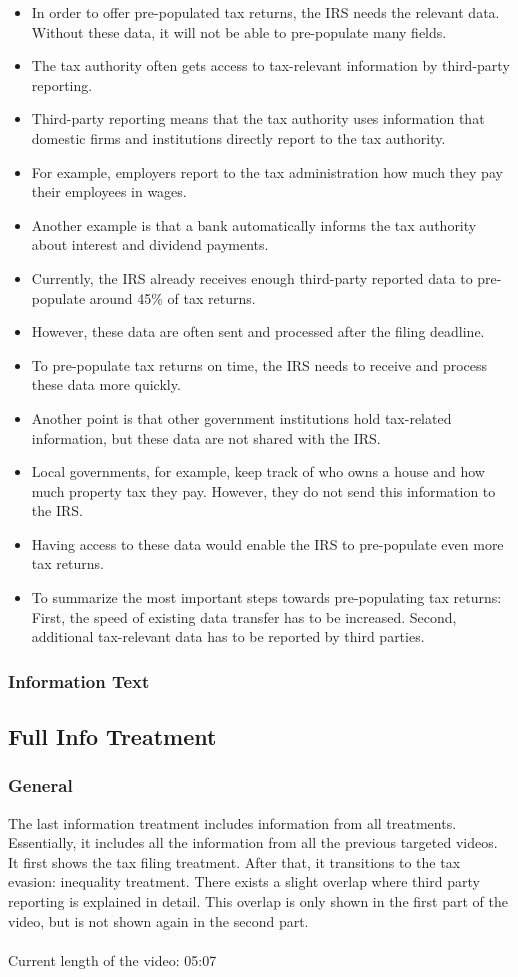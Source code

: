 \documentclass[11pt]{article}
\begin{document}
\begin{itemize}
    \item In order to offer pre-populated tax returns, the IRS needs the relevant data. Without these data, it will not be able to pre-populate many fields. 
    \item The tax authority often gets access to tax-relevant information by third-party reporting. 
    \item Third-party reporting means that the tax authority uses information that domestic firms and institutions directly report to the tax authority. 
    \item For example, employers report to the tax administration how much they pay their employees in wages. 
    \item Another example is that a bank automatically informs the tax authority about interest and dividend payments. 
    \item Currently, the IRS already receives enough third-party reported data to pre-populate around 45\% of tax returns. 
    \item However, these data are often sent and processed after the filing deadline.
    \item To pre-populate tax returns on time, the IRS needs to receive and process these data more quickly. 
    \item Another point is that other government institutions hold tax-related information, but these data are not shared with the IRS. 
    \item Local governments, for example, keep track of who owns a house and how much property tax they pay. However, they do not send this information to the IRS. 
    \item Having access to these data would enable the IRS to pre-populate even more tax returns. 
    \item To summarize the most important steps towards pre-populating tax returns: First, the speed of existing data transfer has to be increased. Second, additional tax-relevant data has to be reported by third parties.
\end{itemize}

\subsubsection*{Information Text}
\subsection{Full Info Treatment}
\subsubsection*{General}
The last information treatment includes information from all treatments. Essentially, it includes all the information from all the previous targeted videos. It first shows the tax filing treatment. After that, it transitions to the tax evasion: inequality treatment. There exists a slight overlap where third party reporting is explained in detail. This overlap is only shown in the first part of the video, but is not shown again in the second part.  
\\ \\
Current length of the video: 05:07
\end{document}
